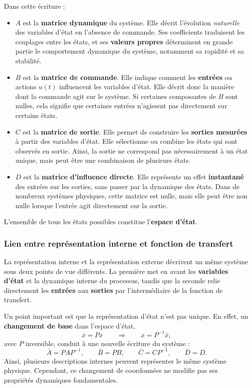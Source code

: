 \documentclass[11pt,a4paper]{article}
\begin{document}
Dans cette écriture :
\begin{itemize}
    \item \(A\) est la \textbf{matrice dynamique} du système. Elle décrit l'évolution \textit{naturelle} des variables d'état en l'absence de commande. Ses coefficients traduisent les couplages entre les états, et ses \textbf{valeurs propres} déterminent en grande partie le comportement dynamique du système, notamment sa rapidité et sa stabilité.

    \item \(B\) est la \textbf{matrice de commande}. Elle indique comment les \textbf{entrées} ou actions \(u(t)\) influencent les variables d'état. Elle décrit donc la manière dont la commande agit sur le système. Si certaines composantes de \(B\) sont nulles, cela signifie que certaines entrées n'agissent pas directement sur certains états.

    \item \(C\) est la \textbf{matrice de sortie}. Elle permet de construire les \textbf{sorties mesurées} à partir des variables d'état. Elle sélectionne ou combine les états qui sont observés en sortie. Ainsi, la sortie ne correspond pas nécessairement à un état unique, mais peut être une combinaison de plusieurs états.

    \item \(D\) est la \textbf{matrice d'influence directe}. Elle représente un effet \textbf{instantané} des entrées sur les sorties, sans passer par la dynamique des états. Dans de nombreux systèmes physiques, cette matrice est nulle, mais elle peut être non nulle lorsque l'entrée agit directement sur la sortie.
\end{itemize}

L'ensemble de tous les états possibles constitue l'\textbf{espace d'état}.

\subsubsection{Lien entre représentation interne et fonction de transfert}

La représentation interne et la représentation externe décrivent un même système sous deux points de vue différents. La première met en avant les \textbf{variables d'état} et la dynamique interne du processus, tandis que la seconde relie directement les \textbf{entrées} aux \textbf{sorties} par l'intermédiaire de la fonction de transfert.

Un point important est que la représentation d'état n'est pas unique. En effet, un \textbf{changement de base} dans l'espace d'état,
\[
\bar{x} = Px \qquad \Rightarrow \qquad x = P^{-1}\bar{x},
\]
avec \(P\) inversible, conduit à une nouvelle écriture du système :
\[
\bar{A} = PAP^{-1}, \qquad \bar{B} = PB, \qquad \bar{C} = CP^{-1}, \qquad \bar{D} = D.
\]
Ainsi, plusieurs descriptions internes peuvent représenter le même système physique. Cependant, ce changement de coordonnées ne modifie pas ses propriétés dynamiques fondamentales.
\end{document}
